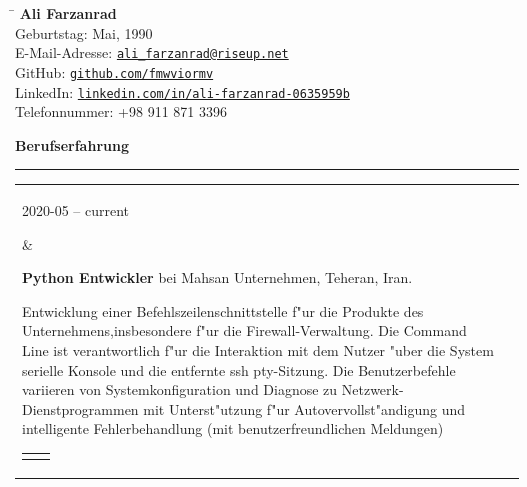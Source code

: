 \documentclass[11pt,a4paper,oneside]{article}
\makeatletter
\newcommand{\https}[1]{\href{https://#1}{\nolinkurl{#1}}}
\newcommand{\mailto}[1]{\href{mailto://#1}{\nolinkurl{#1}}}
\newcommand{\prog}{Programmiersprache:}
\newcommand{\os}{Betriebssystem:}
\newcommand{\vcs}{Versionskontrollen:}
\newcommand{\issue}{Problemverfolgung:}
\renewcommand{\section}[1]{%
{\large\textbf{#1}}\\
\rule[9pt]{18cm}{.4pt}\vspace{-15pt}%
}
\newenvironment{mytable}{%
\begin{tabular}{@{}l@{\hspace{4mm}}l@{}}%
}{\end{tabular}}
\newcommand{\myitem}[2]{%
\parbox[t]{16mm}{#1}&\parbox[t]{16cm}{#2}\\%
}
\newenvironment{innertable}{%
\begin{tabular}{@{}l@{\hspace{5mm}}l@{}}%
}{\end{tabular}}
\newcommand{\inneritem}[2]{%
\parbox{35mm}{{\color{darkgray}#1}}&\parbox{12cm}{#2}\\%
}
\makeatother
\begin{document}
%
%
\hspace{1cm}%
\parbox[b]{12cm}{%
\begin{tabbing}%
\hspace{3cm}\=\kill%
\textbf{{\LARGE Ali Farzanrad}}\\[5mm]
Geburtstag:  Mai, 1990\\[1mm]
E-Mail-Adresse: \>
\mailto{ali_farzanrad@riseup.net}\\[1mm]
GitHub: \>
\https{github.com/fmwviormv}\\[1mm]
LinkedIn: \>
\https{linkedin.com/in/ali-farzanrad-0635959b}\\[1mm]
Telefonnummer: \>
{+}98{ }911{ }871{ }3396\\
\end{tabbing}%
}

\section{Berufserfahrung}

\begin{mytable}
\myitem{2020-05 -- current}{%
\textbf{Python Entwickler} bei
Mahsan Unternehmen, Teheran, Iran.

Entwicklung einer Befehlszeilenschnittstelle f"ur die Produkte
des Unternehmens,insbesondere f"ur die Firewall-Verwaltung.
Die Command Line ist verantwortlich f"ur die Interaktion mit dem Nutzer
"uber die System serielle Konsole und die entfernte ssh pty-Sitzung.
Die Benutzerbefehle variieren von Systemkonfiguration und Diagnose
zu Netzwerk-Dienstprogrammen mit Unterst"utzung
f"ur Autovervollst"andigung und intelligente Fehlerbehandlung
(mit benutzerfreundlichen Meldungen)

\begin{innertable}
\inneritem{\prog}{Python 3}
\inneritem{\os}{Ubuntu}
\inneritem{\vcs}{Git}
\inneritem{\issue}{Gitlab}
\end{innertable}
}
\end{mytable}
\end{document}
